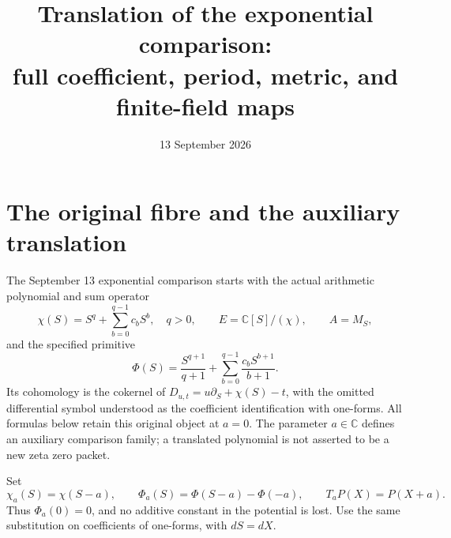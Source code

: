 \documentclass[11pt,a4paper]{article}
\begin{document}
\title{Translation of the exponential comparison:\\full coefficient, period, metric, and finite-field maps}
\author{}
\date{13 September 2026}
\maketitle

\section{The original fibre and the auxiliary translation}
The September 13 exponential comparison starts with the actual arithmetic
polynomial and sum operator
\[
 \chi(S)=S^q+\sum_{b=0}^{q-1}c_bS^b,\quad q>0,\qquad
 E=\mathbb C[S]/(\chi),\qquad A=M_S,
\]
and the specified primitive
\[
 \Phi(S)=\frac{S^{q+1}}{q+1}
       +\sum_{b=0}^{q-1}\frac{c_bS^{b+1}}{b+1}.
\]
Its cohomology is the cokernel of
\(D_{u,t}=u\partial_S+\chi(S)-t\), with the omitted differential symbol
understood as the coefficient identification with one-forms. All formulas
below retain this original object at \(a=0\). The parameter \(a\in\mathbb C\)
defines an auxiliary comparison family; a translated polynomial is not
asserted to be a new zeta zero packet.

Set
\begin{equation}\tag{DT.1}
 \chi_a(S)=\chi(S-a),\qquad
 \Phi_a(S)=\Phi(S-a)-\Phi(-a),\qquad
 T_aP(X)=P(X+a).
\end{equation}
Thus \(\Phi_a(0)=0\), and no additive constant in the potential is lost.
Use the same substitution on coefficients of one-forms, with \(dS=dX\).
\end{document}
